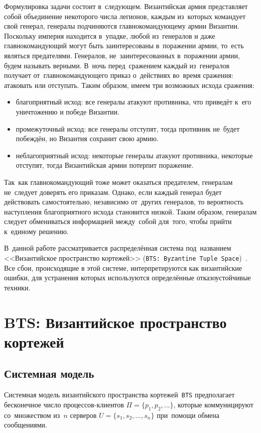 Формулировка задачи состоит в~следующем. Византийская армия представляет собой объединение некоторого числа легионов, каждым из~которых командует свой генерал, генералы подчиняются главнокомандующему армии Византии. Поскольку империя находится в~упадке, любой из~генералов и даже главнокомандующий могут быть заинтересованы в~поражении армии, то~есть являться предателями. Генералов, не~заинтересованных в~поражении армии, будем называть верными. В~ночь перед~сражением каждый из~генералов получает от~главнокомандующего приказ о~действиях во~время сражения: атаковать или отступать. Таким образом, имеем три возможных исхода сражения:
\begin{itemize}
	\item благоприятный исход: все генералы атакуют противника, что приведёт к~его уничтожению и победе Византии.
	\item промежуточный исход: все генералы отступят, тогда противник не~будет побеждён, но Византия сохранит свою армию.
	\item неблагоприятный исход: некоторые генералы атакуют противника, некоторые отступят, тогда Византийская армии потерпит поражение.
\end{itemize}

Так~как главнокомандующий тоже может оказаться предателем, генералам не~следует доверять его приказам. Однако, если каждый генерал будет действовать самостоятельно, независимо от~других генералов, то вероятность наступления благоприятного исхода становится низкой. Таким образом, генералам следует обмениваться информацией между~собой для~того, чтобы прийти к~единому решению.

В~данной работе рассматривается распределённая система под~названием <<Византийское пространство кортежей>> (\texttt{BTS: Byzantine Tuple Space})~\autocite{bts}. Все сбои, происходящие в этой системе, интерпретируются как византийские ошибки, для устранения которых используются определённые отказоустойчивые техники. 


\section{BTS: Византийское пространство кортежей}\label{sec:2}
\subsection{Системная модель}\label{subsec:1}
Системная модель византийского пространства кортежей~\texttt{BTS} предполагает бесконечное число процессов-клиентов $\Pi = \{p_1, p_2, \dots\}$, которые коммуницируют со~множеством из~$n$ серверов $U = \{s_1, s_2, \dots, s_n\}$ при~помощи обмена сообщениями.

